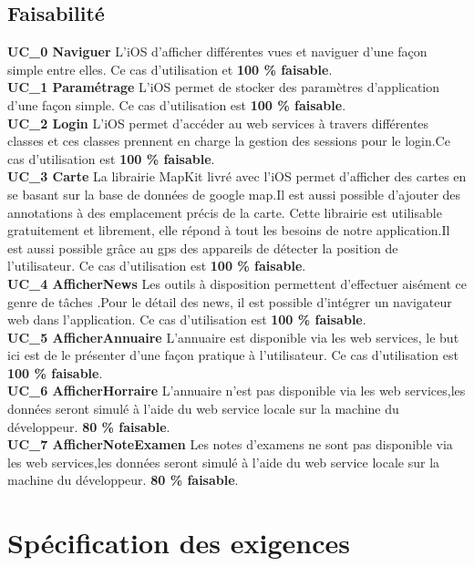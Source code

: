 	\subsection{Faisabilité}
		\textbf{UC\_0  Naviguer}  L'\gls{iOS} d'afficher différentes vues et naviguer d'une façon simple entre elles. Ce cas d'utilisation et \textbf{100 \%  faisable}.\\[0.2cm]
		\textbf{UC\_1  Paramétrage}  L'\gls{iOS} permet de stocker des paramètres d'application d'une façon simple. Ce cas d'utilisation est \textbf{100 \%  faisable}.\\[0.2cm]
		\textbf{UC\_2  Login}  L'\gls{iOS} permet d'accéder au web services à travers différentes classes et ces classes prennent en charge la gestion des sessions pour le login.Ce cas d'utilisation est \textbf{100 \%  faisable}.\\[0.2cm]
		\textbf{UC\_3  Carte}  La librairie MapKit livré avec l'\gls{iOS} permet d'afficher des cartes en se basant sur la base de données de google map.Il est aussi possible d'ajouter des annotations à des emplacement précis de la carte. Cette librairie est utilisable gratuitement et librement, elle répond à tout les besoins de notre application.Il est aussi possible grâce au gps des appareils de détecter la position de l'utilisateur.  Ce cas d'utilisation est \textbf{100 \%  faisable}.\\[0.2cm]
		\textbf{UC\_4  AfficherNews}  Les outils à disposition permettent d'effectuer aisément ce genre de tâches  .Pour le détail des news, il est possible d'intégrer un navigateur web dans l'application. Ce cas d'utilisation est \textbf{100 \%  faisable}.\\[0.2cm]
		\textbf{UC\_5 AfficherAnnuaire}  L'annuaire est disponible via les web services, le but ici est de le présenter d'une façon pratique à l'utilisateur. Ce cas d'utilisation est \textbf{100 \%  faisable}.\\[0.2cm]
		\textbf{UC\_6 AfficherHorraire}  L'annuaire n'est pas disponible via les web services,les données seront simulé à l'aide du web service locale sur la machine du développeur. \textbf{80 \%  faisable}.\\[0.2cm]
		\textbf{UC\_7 AfficherNoteExamen}   Les notes d'examens ne sont pas disponible via les web services,les données seront simulé à l'aide du web service locale sur la machine du développeur. \textbf{80 \%  faisable}.\\[0.2cm]
		
\section{Spécification des exigences }
